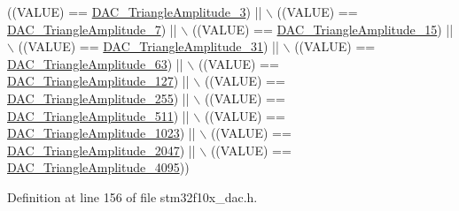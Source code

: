 \begin{DoxyCode}
                                                      ((VALUE) == 
      \hyperlink{group___d_a_c__lfsrunmask__triangleamplitude_ga9798d68c3bbf0a57306bf2f962697377}{DAC\_TriangleAmplitude\_3}) || \(\backslash\)
                                                      ((VALUE) == 
      \hyperlink{group___d_a_c__lfsrunmask__triangleamplitude_gad3f31de1277836df1109576a53c47e87}{DAC\_TriangleAmplitude\_7}) || \(\backslash\)
                                                      ((VALUE) == 
      \hyperlink{group___d_a_c__lfsrunmask__triangleamplitude_ga42653712ce783d33ecb2f3e97e9c2ece}{DAC\_TriangleAmplitude\_15}) || \(\backslash\)
                                                      ((VALUE) == 
      \hyperlink{group___d_a_c__lfsrunmask__triangleamplitude_ga10b15745b749c62a56bd3d7bd5a27e1b}{DAC\_TriangleAmplitude\_31}) || \(\backslash\)
                                                      ((VALUE) == 
      \hyperlink{group___d_a_c__lfsrunmask__triangleamplitude_gaaae92dae9c4da55e29c645396825e36b}{DAC\_TriangleAmplitude\_63}) || \(\backslash\)
                                                      ((VALUE) == 
      \hyperlink{group___d_a_c__lfsrunmask__triangleamplitude_gaacec0af3f69db46f8984be3af9ecadfb}{DAC\_TriangleAmplitude\_127}) || \(\backslash\)
                                                      ((VALUE) == 
      \hyperlink{group___d_a_c__lfsrunmask__triangleamplitude_gadb404422c86a7b92d78e6d9617e8ce4d}{DAC\_TriangleAmplitude\_255}) || \(\backslash\)
                                                      ((VALUE) == 
      \hyperlink{group___d_a_c__lfsrunmask__triangleamplitude_ga565b0c97bbdf152756617d491bf8ef85}{DAC\_TriangleAmplitude\_511}) || \(\backslash\)
                                                      ((VALUE) == 
      \hyperlink{group___d_a_c__lfsrunmask__triangleamplitude_ga7d573b0cebb1b939bd83367effb93d89}{DAC\_TriangleAmplitude\_1023}) || \(\backslash\)
                                                      ((VALUE) == 
      \hyperlink{group___d_a_c__lfsrunmask__triangleamplitude_gad33d28d7fcc09d84500ea9b6e6c5feed}{DAC\_TriangleAmplitude\_2047}) || \(\backslash\)
                                                      ((VALUE) == 
      \hyperlink{group___d_a_c__lfsrunmask__triangleamplitude_ga3ce69f5a63a2464dc4b5f73cb6fe72f5}{DAC\_TriangleAmplitude\_4095}))
\end{DoxyCode}


Definition at line 156 of file stm32f10x\+\_\+dac.\+h.

